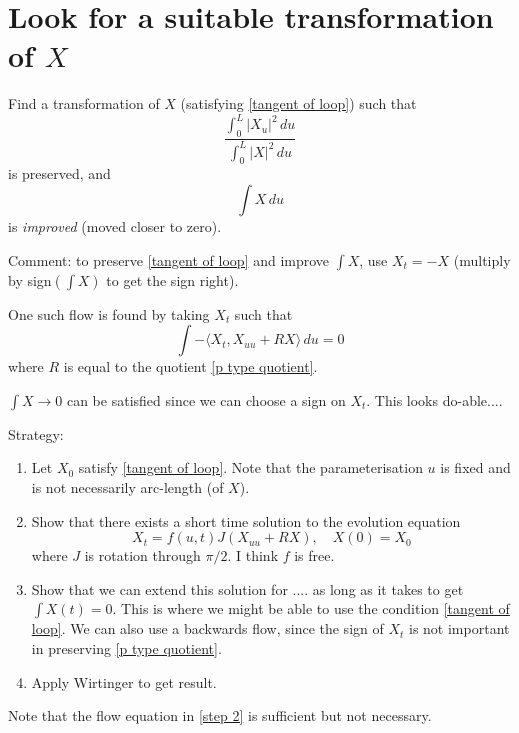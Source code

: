 \documentclass{amsart}
\begin{document}

 \section*{Look for a suitable transformation of $X$}
  
  Find a transformation of $X$ (satisfying \eqref{tangent of loop}) such that 
  \begin{equation} \label{p type quotient} \frac{\int_0^L |X_u|^2 \,du }{\int_0^L |X|^2 \,du } \end{equation}
  is preserved, and 
  $$\int X \,du$$ is \emph{improved} (moved closer to zero).
   
 
  
  Comment:   to preserve \eqref{tangent of loop} and improve $\int X$, use $X_t=-X$ (multiply by sign$(\int X)$ to get the sign right).   
  
  One such flow is found by taking $X_t$ such that 
  \[ \int -\langle X_t, X_{uu} + RX\rangle \,du =0 \]
  where $R$ is equal to the quotient \eqref{p type quotient}.   
 
 $\int X \rightarrow 0$ can be satisfied since we can choose a sign on $X_t$.     This looks do-able....
 
 Strategy:

\begin{enumerate}
\item   Let $X_0$ satisfy \eqref{tangent of loop}.   Note that the parameterisation $u$ is fixed and is not necessarily arc-length (of $X$).       
\item Show that there exists a short time solution to the evolution equation \label{step 2}
$$X_t= f(u,t) J(X_{uu}+ RX), \quad X(0)=X_0$$
where $J$ is rotation through $\pi/2$.   I think $f$ is free.  
%
% 
%
\item Show that we can extend this solution for .... as long as it takes to get $\int X(t)=0$.    This is where we might be able to use the condition \eqref{tangent of loop}.    We can also use a backwards flow, since the sign of $X_t$ is not important in preserving \eqref{p type quotient}.   
%
% 
%


\item Apply Wirtinger to get result.
\end{enumerate}
 
 Note that the flow equation in \ref{step 2} is sufficient but not necessary.    
\end{document}
